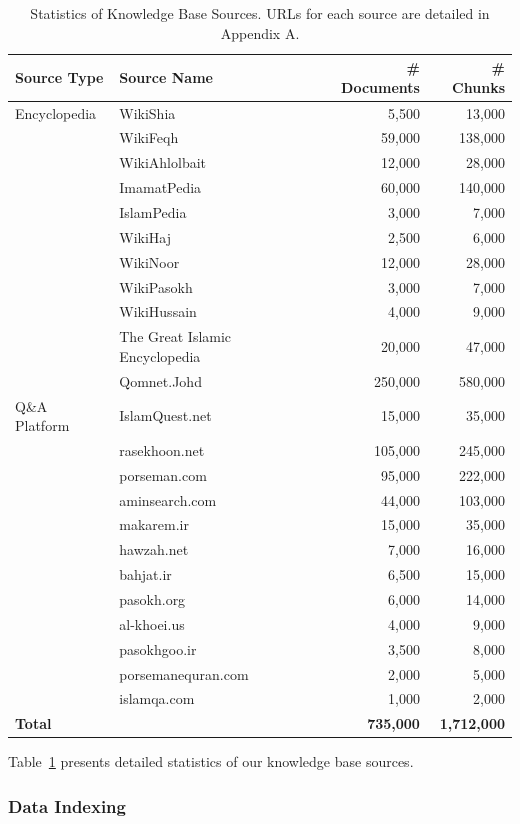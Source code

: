 \documentclass[11pt]{article}
\begin{document}
\begin{table}[t]
\centering
\small
\begin{tabular}{llrr}
\hline
\textbf{Source Type} & \textbf{Source Name} & \textbf{\# Documents} & \textbf{\# Chunks} \\
\hline
Encyclopedia & WikiShia & 5,500 & 13,000 \\
 & WikiFeqh & 59,000 & 138,000 \\
 & WikiAhlolbait & 12,000 & 28,000 \\
 & ImamatPedia & 60,000 & 140,000 \\
 & IslamPedia & 3,000 & 7,000 \\
 & WikiHaj & 2,500 & 6,000 \\
 & WikiNoor & 12,000 & 28,000 \\
 & WikiPasokh & 3,000 & 7,000 \\
 & WikiHussain & 4,000 & 9,000 \\
 & The Great Islamic Encyclopedia & 20,000 & 47,000 \\
 & Qomnet.Johd & 250,000 & 580,000 \\
\hline
Q\&A Platform & IslamQuest.net & 15,000 & 35,000 \\
 & rasekhoon.net & 105,000 & 245,000 \\
 & porseman.com & 95,000 & 222,000 \\
 & aminsearch.com & 44,000 & 103,000 \\
 & makarem.ir & 15,000 & 35,000 \\
 & hawzah.net & 7,000 & 16,000 \\
 & bahjat.ir & 6,500 & 15,000 \\
 & pasokh.org & 6,000 & 14,000 \\
 & al-khoei.us & 4,000 & 9,000 \\
 & pasokhgoo.ir & 3,500 & 8,000 \\
 & porsemanequran.com & 2,000 & 5,000 \\
 & islamqa.com & 1,000 & 2,000 \\
\hline
\textbf{Total} & & \textbf{735,000} & \textbf{1,712,000} \\
\hline
\end{tabular}
\caption{Statistics of Knowledge Base Sources. URLs for each source are detailed in Appendix A.}
\label{tab:kb-sources}
\end{table}

Table~\ref{tab:kb-sources} presents detailed statistics of our knowledge base sources.

\subsubsection{Data Indexing}
\end{document}
